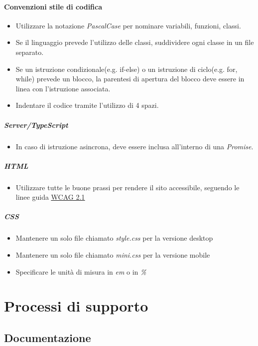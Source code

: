 \documentclass[a4paper, 12pt]{article}
\begin{document}
\paragraph{Convenzioni stile di codifica}
\begin{itemize}
	\item Utilizzare la notazione \textit{PascalCase} per nominare variabili, funzioni, classi.
	\item Se il linguaggio prevede l'utilizzo delle classi, suddividere ogni classe in un file separato.
	\item Se un istruzione condizionale(e.g. if-else) o un istruzione di ciclo(e.g. for, while) prevede un blocco,
	la parentesi di apertura del blocco deve essere in linea con l'istruzione associata.
	\item Indentare il codice tramite l'utilizzo di 4 spazi.
\end{itemize}
\subparagraph{Server/TypeScript}
\begin{itemize}
	\item In caso di istruzione asincrona, deve essere inclusa all'interno di una \textit{Promise}.
\end{itemize}
\subparagraph{HTML}
\begin{itemize}
	\item Utilizzare tutte le buone prassi per rendere il sito accessibile, seguendo le linee guida 
	\href{https://www.w3.org/Translations/WCAG21-it/}{\underline{WCAG 2.1}}
\end{itemize}
\subparagraph{CSS}
	\begin{itemize}
		\item Mantenere un solo file chiamato \textit{style.css} per la versione desktop 
		\item Mantenere un solo file chiamato \textit{mini.css} per la versione mobile
		\item Specificare le unità di misura in \textit{em} o in \textit{\%}
	\end{itemize}

\section{Processi di supporto}
\subsection{Documentazione}
\end{document}
